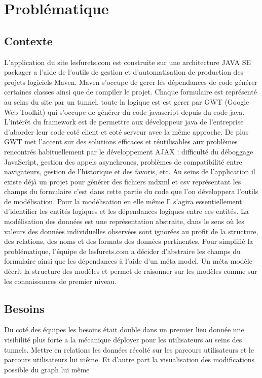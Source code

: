 \chapter{Problématique}

\section{Contexte}
L'application du site lesfurets.com est construite sur une architecture JAVA SE packager a l’aide de l'outils de gestion et d'automatisation de production des projets logiciels Maven. Maven s’occupe de gerer les dépendances de code générer certaines classes ainsi que de compiler le projet. Chaque formulaire est représenté au seins du site par un tunnel, toute la logique est est gerer par GWT (Google Web Toolkit) qui s’occupe de générer du code javascript depuis du code java. L'intérêt du framework est de permettre aux développeur java de l’entreprise d’aborder leur code coté client et coté serveur avec la même approche. De plus GWT met l'accent sur des solutions efficaces et réutilisables aux problèmes rencontrés habituellement par le développement AJAX : difficulté du déboggage JavaScript, gestion des appels asynchrones, problèmes de compatibilité entre navigateurs, gestion de l'historique et des favoris, etc.
Au seins de l’application il existe déjà un projet pour générer des fichiers mdxml et csv représentant les champs du formulaire c’est dans cette partie du code que l’on développera l’outils de modélisation.
Pour la modélisation en elle même Il s'agira essentiellement d'identifier les entités logiques et les dépendances logiques entre ces entités. La modélisation des données est une représentation abstraite, dans le sens où les valeurs des données individuelles observées sont ignorées au profit de la structure, des relations, des noms et des formats des données pertinentes.
Pour simplifié la problématique, l’équipe de lesfurets.com a décider d’abstraire les champs du formulaire ainsi que les dépendances à l’aide d'un méta model. Un méta modèle décrit la structure des modèles et permet de raisonner sur les modèles comme sur les connaissances de premier niveau.

\section{Besoins}
Du coté des équipes les besoins était double dans un premier lieu donnée une visibilité plus forte a la mécanique déployer pour les utilisateurs au seins des tunnels. Mettre en relations les données récolté sur les parcours utilisateurs et le parcours utilisateurs lui même. Et d’autre part la visualisation des modifications possible du graph lui même
